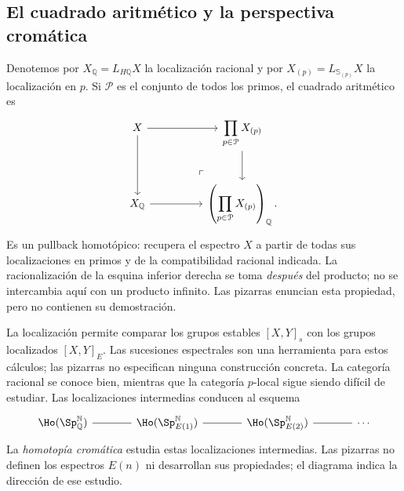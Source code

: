 \subsection{El cuadrado aritmético y la perspectiva cromática}
Denotemos por $X_{\mathbb Q}=L_{H\mathbb Q}X$ la localización racional y por $X_{(p)}=L_{\mathbb S_{(p)}}X$ la localización en $p$. Si $\mathcal P$ es el conjunto de todos los primos, el cuadrado aritmético es
\[
\begin{tikzcd}[column sep=huge,row sep=large]
X\arrow[r]\arrow[d]
&\displaystyle\prod_{p\in\mathcal P}X_{(p)}\arrow[d]\\
X_{\mathbb Q}\arrow[r]
&\displaystyle\left(\prod_{p\in\mathcal P}X_{(p)}\right)_{\mathbb Q}
\arrow[ul,phantom,"\ulcorner",very near start].
\end{tikzcd}
\]
Es un pullback homotópico: recupera el espectro $X$ a partir de todas sus localizaciones en primos y de la compatibilidad racional indicada. La racionalización de la esquina inferior derecha se toma \emph{después} del producto; no se intercambia aquí con un producto infinito. Las pizarras enuncian esta propiedad, pero no contienen su demostración.

La localización permite comparar los grupos estables $[X,Y]_s$ con los grupos localizados $[X,Y]_E$. Las sucesiones espectrales son una herramienta para estos cálculos; las pizarras no especifican ninguna construcción concreta. La categoría racional se conoce bien, mientras que la categoría $p$-local sigue siendo difícil de estudiar. Las localizaciones intermedias conducen al esquema
\[
\begin{tikzcd}[column sep=large]
\Ho(\Sp_{\mathbb Q}^{\mathbb N})\arrow[r,dash]
&\Ho(\Sp_{E(1)}^{\mathbb N})\arrow[r,dash]
&\Ho(\Sp_{E(2)}^{\mathbb N})\arrow[r,dash]&\cdots
\end{tikzcd}
\]
La \emph{homotopía cromática} estudia estas localizaciones intermedias. Las pizarras no definen los espectros $E(n)$ ni desarrollan sus propiedades; el diagrama indica la dirección de ese estudio.
